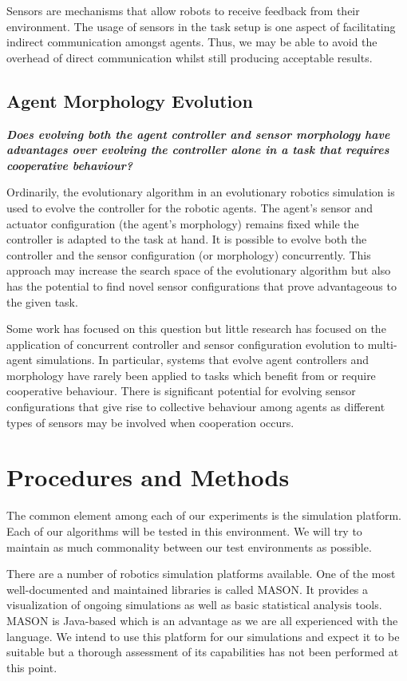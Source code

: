 \documentclass[a4paper,12pt]{article}
\begin{document}
Sensors are mechanisms that allow robots to receive feedback from their environment. The usage of sensors in the task setup is one aspect of facilitating indirect communication amongst agents. Thus, we may be able to avoid the overhead of direct communication whilst still producing acceptable results.


\subsection{Agent Morphology Evolution}

\textbf{ \textit{Does evolving both the agent controller and sensor morphology have advantages over evolving the controller alone in a task that requires cooperative behaviour?}}

Ordinarily, the evolutionary algorithm in an evolutionary robotics simulation is used to evolve the controller for the robotic agents. The agent’s sensor and actuator configuration (the agent's morphology) remains fixed while the controller is adapted to the task at hand. It is possible to evolve both the controller and the sensor configuration (or morphology) concurrently. This approach may increase the search space of the evolutionary algorithm but also has the potential to find novel sensor configurations that prove advantageous to the given task.

Some work has focused on this question but little research has focused on the application of concurrent controller and sensor configuration evolution to multi-agent simulations. In particular, systems that evolve agent controllers and morphology have rarely been applied to tasks which benefit from or require cooperative behaviour. There is significant potential for evolving sensor configurations that give rise to collective behaviour among agents as different types of sensors may be involved when cooperation occurs.


\section{Procedures and Methods}
The common element among each of our experiments is the simulation platform. Each of our algorithms will be tested in this environment. We will try to maintain as much commonality between our test environments as possible.

There are a number of robotics simulation platforms available. One of the most well-documented and maintained libraries is called MASON. It provides a visualization of ongoing simulations as well as basic statistical analysis tools. MASON is Java-based which is an advantage as we are all experienced with the language. We intend to use this platform for our simulations and expect it to be suitable but a thorough assessment of its capabilities has not been performed at this point.
\end{document}
